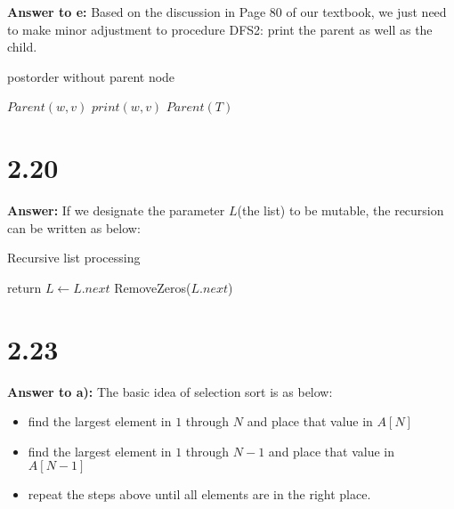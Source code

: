 \documentclass[a4paper,11pt]{article}
\theoremstyle{mytheor}
\begin{document}
\noindent\textbf{Answer to e:} Based on the discussion in Page 80 of our textbook, we just need to make minor adjustment to procedure DFS2: print the parent as well as the child.
\begin{algorithm}[H]
\caption{postorder without parent node}\label{sec:TREEEVALUATION_2_19_E}
\begin{algorithmic}[1]
    \State $Parent(w, v)$
    \State $print(w, v)$
  \EndFor
\EndProcedure
\State
{}
  \State $Parent(T)$
\EndProcedure
\end{algorithmic}
\end{algorithm}

\vspace{1.2in}


\section*{2.20}
\noindent\textbf{Answer:} If we designate the parameter $L$(the list) to be mutable, the recursion can be written as below:

\begin{algorithm}[H]
\caption{Recursive list processing}\label{sec:TREEEVALUATION_2_20}
\begin{algorithmic}[1]
    \State return
    \State $L \gets L.next$ 
  \EndIf
    \State RemoveZeros($L.next$)
  \EndIf
\EndProcedure
\end{algorithmic}
\end{algorithm}

\vspace{1.2in}

\section*{2.23}
\noindent\textbf{Answer to a):} The basic idea of selection sort is as below:
\begin{itemize}
    \item find the largest element in $1$ through $N$ and place that value in $A[N]$
    \item find the largest element in $1$ through $N-1$ and place that value in $A[N-1]$
    \item repeat the steps above until all elements are in the right place.
\end{itemize}
\end{document}
